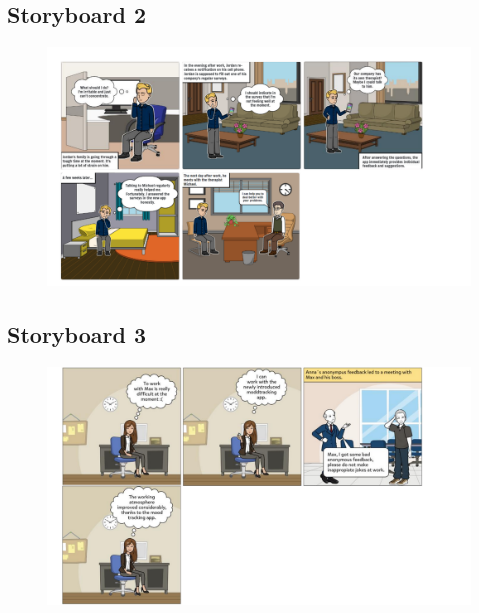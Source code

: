 \documentclass[11pt]{article}
\begin{document}
\subsection{Storyboard 2}
\begin{figure}[!h]
    \centering
    \includegraphics[scale = 0.5]{figures/Storyboard ich.pdf}
\end{figure}

\subsection{Storyboard 3}
\begin{figure}[!h]
    \centering
    \includegraphics[scale = 0.5]{figures/Storyboard Laurenz.pdf}
\end{figure}

\clearpage
\end{document}

